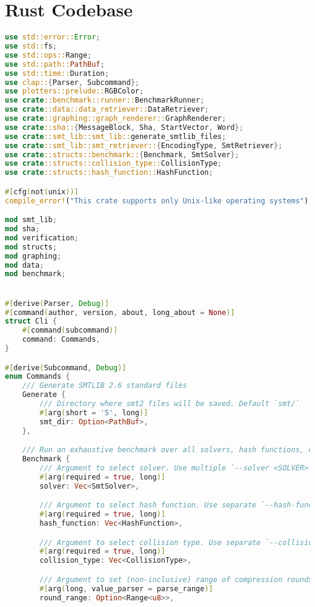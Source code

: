 \section{Rust Codebase}
\label{sec:codebase}
\begin{lstlisting}[language=rust, caption={main.rs}]
use std::error::Error;
use std::fs;
use std::ops::Range;
use std::path::PathBuf;
use std::time::Duration;
use clap::{Parser, Subcommand};
use plotters::prelude::RGBColor;
use crate::benchmark::runner::BenchmarkRunner;
use crate::data::data_retriever::DataRetriever;
use crate::graphing::graph_renderer::GraphRenderer;
use crate::sha::{MessageBlock, Sha, StartVector, Word};
use crate::smt_lib::smt_lib::generate_smtlib_files;
use crate::smt_lib::smt_retriever::{EncodingType, SmtRetriever};
use crate::structs::benchmark::{Benchmark, SmtSolver};
use crate::structs::collision_type::CollisionType;
use crate::structs::hash_function::HashFunction;

#[cfg(not(unix))]
compile_error!("This crate supports only Unix-like operating systems");

mod smt_lib;
mod sha;
mod verification;
mod structs;
mod graphing;
mod data;
mod benchmark;


#[derive(Parser, Debug)]
#[command(author, version, about, long_about = None)]
struct Cli {
	#[command(subcommand)]
	command: Commands,
}

#[derive(Subcommand, Debug)]
enum Commands {
	/// Generate SMTLIB 2.6 standard files
	Generate {
		/// Directory where smt2 files will be saved. Default `smt/`
		#[arg(short = 'S', long)]
		smt_dir: Option<PathBuf>,
	},

	/// Run an exhaustive benchmark over all solvers, hash functions, collision types and arguments
	Benchmark {
		/// Argument to select solver. Use multiple `--solver <SOLVER>` statements for multiple solvers
		#[arg(required = true, long)]
		solver: Vec<SmtSolver>,

		/// Argument to select hash function. Use separate `--hash-function <HASH_FUNCTION>` statements for multiple hash functions
		#[arg(required = true, long)]
		hash_function: Vec<HashFunction>,

		/// Argument to select collision type. Use separate `--collision-type <COLLISION_TYPE>` statements for multiple collision types
		#[arg(required = true, long)]
		collision_type: Vec<CollisionType>,

		/// Argument to set (non-inclusive) range of compression rounds. Input with `--round-range <MIN>..<MAX>`. Default 1..hash function max
		#[arg(long, value_parser = parse_range)]
		round_range: Option<Range<u8>>,


\end{lstlisting}
